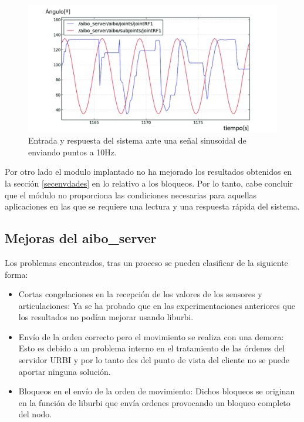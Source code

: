 \documentclass[12pt,a4paper,final,twoside]{book}
\begin{document}
   \begin{figure}[H]
	\centering
    \includegraphics[scale=0.28]{images/10Ry10SAll.jpg}
 	\caption{Entrada y respuesta del sistema ante una señal sinusoidal de enviando puntos a 10Hz.}
  \label{fig:ASsin10Hz}
\end{figure}

Por otro lado el modulo implantado no ha mejorado los resultados obtenidos en la sección \ref{secenvdades} en lo relativo a los bloqueos. Por lo tanto, cabe concluir que el módulo no proporciona las condiciones necesarias para aquellas aplicaciones en las que se requiere una lectura y una respuesta rápida del sistema. 

\subsection{Mejoras del aibo{\_}server}
Los problemas encontrados, tras un proceso se pueden clasificar de la siguiente forma:
\begin{itemize}
\item Cortas congelaciones en la recepción de los valores de los sensores y articulaciones: Ya se ha probado que en las experimentaciones anteriores que los resultados no podían mejorar usando liburbi.
\item Envío de la orden correcto pero el movimiento se realiza con una demora: Esto es debido a un problema interno en el tratamiento de las órdenes del servidor URBI y por lo tanto des del punto de vista del cliente no se puede aportar ninguna solución.
\item Bloqueos en el envío de la orden de movimiento: Dichos bloqueos se originan en la función de liburbi que envía ordenes provocando un bloqueo completo del nodo.
\end{itemize}
\end{document}
